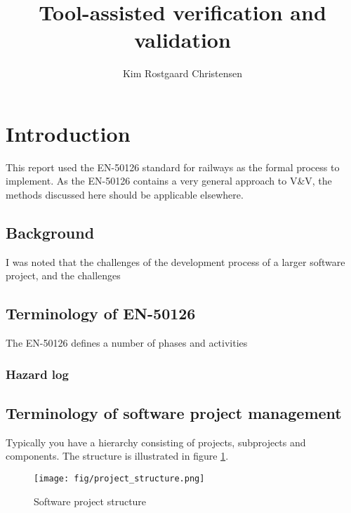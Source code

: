 \documentclass[10pt,a4paper]{article}
\author{Kim Rostgaard Christensen}
\title{Tool-assisted verification and validation}
\begin{document}
\maketitle


\tableofcontents
\newpage

\section{Introduction}
This report used the EN-50126 standard for railways as the formal process to implement. As the EN-50126 contains a very general approach to V\&V, the methods discussed here should be applicable elsewhere.

\subsection{Background}
I was noted that the challenges of the development process of a larger software project, and the challenges


\subsection{Terminology of EN-50126}
The EN-50126 defines a number of phases and activities

\subsubsection{Hazard log}


\subsection{Terminology of software project management}
Typically you have a hierarchy consisting of projects, subprojects and components. The structure is illustrated in figure \ref{fig:project_structure}.

\begin{figure}[h]
\centering
\texttt{[image: fig/project\_structure.png]} 
\caption{Software project structure}
\label{fig:project_structure}
\end{figure}
\end{document}
